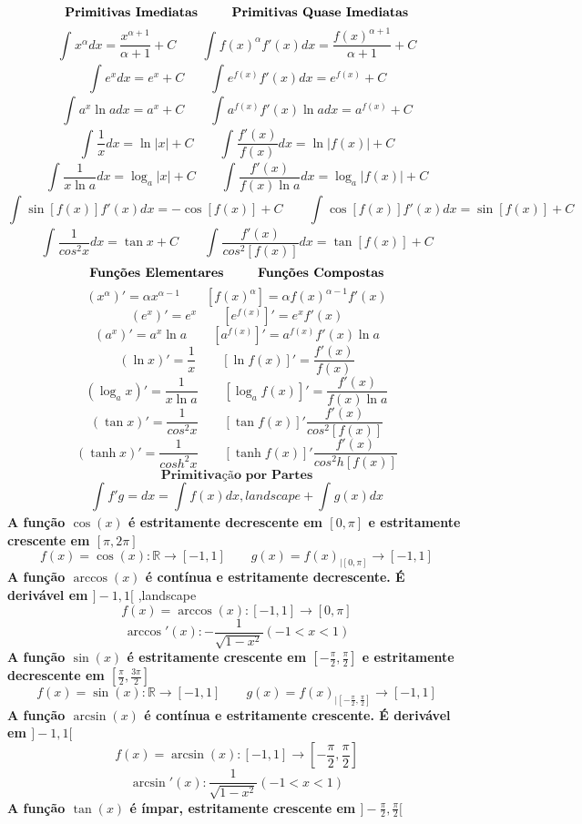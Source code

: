 \documentclass[a4paper]{article}
\begin{document}
	$$\textbf{Primitivas Imediatas \qquad Primitivas Quase Imediatas}$$
	\[\int_{}^{} x^{\alpha} dx = \frac{x^{\alpha+1}}{\alpha +1} + C \qquad \int_{}^{} f(x)^{\alpha}f'(x) dx = \frac{f(x)^{\alpha+1}}{\alpha +1} + C\]
	\[\int_{}^{} e^x dx = e^x +C \qquad \int_{}^{}e^{f(x)} f'(x) dx = e^{f(x)} +C\]
	\[\int_{}^{} a^x\ln{a}dx = a^x +C \qquad \int_{}^{} a^{f(x)}f'(x)\ln{a}dx = a^{f(x)} +C \]
	\[\int_{}^{} \frac{1}{x} dx = \ln |x| +C \qquad \int_{}^{}\frac{f'(x)}{f(x)}dx = \ln{|f(x)|}+C\]
	\[\int_{}^{} \frac{1}{x\ln{a}} dx = \log_{a} |x| +C \qquad \int_{}^{}\frac{f'(x)}{f(x)\ln{a}}dx = \log_{a}{|f(x)|}+C\]
	\[\int_{}^{} \sin{[f(x)]}f'(x)dx = -\cos{[f(x)]} + C \qquad \int_{}^{} \cos{[f(x)]}f'(x)dx = \sin{[f(x)]} + C\]
	\[\int_{}^{} \frac{1}{cos^2{x}} dx = \tan{x} +C\qquad \int_{}^{}\frac{f'(x)}{cos^2{[f(x)]}} dx = \tan{[f(x)]} +C\]
	$$\textbf{Funções Elementares \qquad Funções Compostas}$$
    \[(x^{\alpha})' = \alpha x^{\alpha-1} \qquad [f(x)^{\alpha}]= \alpha f(x)^{\alpha-1}f'(x)\]
    \[(e^x)' = e^x \qquad [e^{f(x)}]' = e^x f'(x)\]
    \[(a^x)' = a^x\ln{a}\qquad  [a^{f(x)}]'= a^{f(x)} f'(x) \ln{a}\]
    \[(\ln{x})' = \frac{1}{x} \qquad [\ln{f(x)}]'=\frac{f'(x)}{f(x)}\]
    \[(\log_{a} x)'= \frac{1}{x\ln{a}} \qquad [\log_{a} f(x)]'= \frac{f'(x)}{f(x)\ln{a}}\]
    \[(\tan{x})' = \frac{1}{cos^2{x}} \qquad [\tan{f(x)}]'\frac{f'(x)}{cos^2{[f(x)]}} \]
    \[(\tanh{x})' = \frac{1}{cosh^2{x}} \qquad [\tanh{f(x)}]'\frac{f'(x)}{cos^2h{[f(x)]}} \]
	$$\textbf{Primitivação por Partes}$$
	\[\int_{}^{} f'g =  dx  = \int_{}^{} f(x)dx ,landscape+ \int_{}^{} g(x)dx \]
    \textbf{A função $\cos(x)$ é estritamente decrescente em $[0,\pi]$ e estritamente crescente em $[\pi,2\pi]$}
    \[f(x)=\cos(x): \mathbb{R} \rightarrow [-1,1]\qquad  g(x)=f(x)_{|[0,\pi]}\rightarrow [-1,1]\]
    \textbf{A função $\arccos(x)$ é contínua e estritamente decrescente. É derivável em $]-1,1[$}
    \centering,landscape
    \[f(x)=\arccos(x): [-1,1] \rightarrow [0,\pi]\]
    \[\arccos'(x): -\frac{1}{\sqrt{1-x^2}} (-1<x<1)\]
    \textbf{A função $\sin(x)$ é estritamente crescente em $[-\frac{\pi}{2},\frac{\pi}{2}]$ e estritamente decrescente em $[\frac{\pi}{2},\frac{3\pi}{2}]$}
    \[f(x)=\sin(x): \mathbb{R} \rightarrow [-1,1]\qquad  g(x)=f(x)_{|[-\frac{\pi}{2},\frac{\pi}{2}]}\rightarrow [-1,1]\]
    \textbf{A função $\arcsin(x)$ é contínua e estritamente crescente. É derivável em $]-1,1[$}
    \centering
    \[f(x)=\arcsin(x): [-1,1] \rightarrow [-\frac{\pi}{2},\frac{\pi}{2}]\]
    \[\arcsin'(x): \frac{1}{\sqrt{1-x^2}} (-1<x<1)\]
    \textbf{A função $\tan(x)$ é ímpar, estritamente crescente em $]-\frac{\pi}{2},\frac{\pi}{2}[$}
\end{document}

